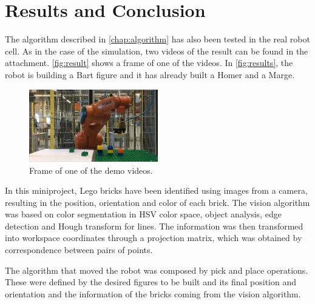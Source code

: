 \chapter{Results and Conclusion}\label{chap:results}
The algorithm described in \autoref{chap:algorithm} has also been tested in the real robot cell. As in the case of the simulation, two videos of the result can be found in the attachment. \autoref{fig:result} shows a frame of one of the videos. In \autoref{fig:results}, the robot is building a Bart figure and it has already built a Homer and a Marge.

\begin{figure}[H]
	\includegraphics[width=0.5\textwidth]{figures/results.png}
    \caption{Frame of one of the demo videos.}
    \label{fig:results}    
\end{figure}

In this miniproject, Lego bricks have been identified using images from a camera, resulting in the position, orientation and color of each brick. The vision algorithm was based on color segmentation in HSV color space, object analysis, edge detection and Hough transform for lines. The information was then transformed into workspace coordinates through a projection matrix, which was obtained by correspondence between pairs of points.

The algorithm that moved the robot was composed by pick and place operations. These were defined by the desired figures to be built and its final position and orientation and the information of the bricks coming from the vision algorithm.